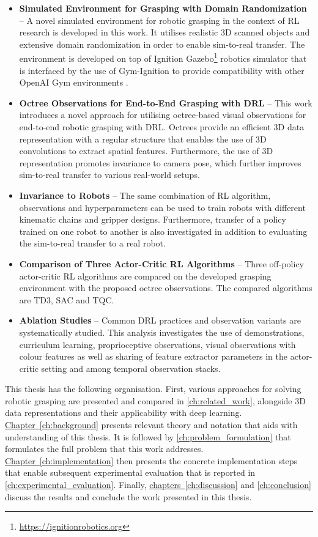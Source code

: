 \begin{itemize}
    \item \textbf{Simulated Environment for Grasping with Domain Randomization} -- A novel simulated environment for robotic grasping in the context of RL research is developed in this work. It utilises realistic 3D scanned objects and extensive domain randomization in order to enable sim-to-real transfer. The environment is developed on top of Ignition Gazebo\footnote{\href{https://ignitionrobotics.org}{https://ignitionrobotics.org}} robotics simulator that is interfaced by the use of Gym-Ignition \cite{ferigo_gym-ignition_2020} to provide compatibility with other OpenAI Gym environments \cite{brockman_openai_2016}.
    \item \textbf{Octree Observations for End-to-End Grasping with DRL} -- This work introduces a novel approach for utilising octree-based visual observations for end-to-end robotic grasping with DRL. Octrees provide an efficient 3D data representation with a regular structure that enables the use of 3D convolutions to extract spatial features. Furthermore, the use of 3D representation promotes invariance to camera pose, which further improves sim-to-real transfer to various real-world setups.
    \item \textbf{Invariance to Robots} -- The same combination of RL algorithm, observations and hyperparameters can be used to train robots with different kinematic chains and gripper designs. Furthermore, transfer of a policy trained on one robot to another is also investigated in addition to evaluating the sim-to-real transfer to a real robot.
    \item \textbf{Comparison of Three Actor-Critic RL Algorithms} -- Three off-policy actor-critic RL algorithms are compared on the developed grasping environment with the proposed octree observations. The compared algorithms are TD3, SAC and TQC.
    \item \textbf{Ablation Studies} -- Common DRL practices and observation variants are systematically studied. This analysis investigates the use of demonstrations, curriculum learning, proprioceptive observations, visual observations with colour features as well as sharing of feature extractor parameters in the actor-critic setting and among temporal observation stacks.
\end{itemize}

This thesis has the following organisation. First, various approaches for solving robotic grasping are presented and compared in \autoref{ch:related_work}, alongside 3D data representations and their applicability with deep learning. \hyperref[ch:background]{Chapter~\ref*{ch:background}} presents relevant theory and notation that aids with understanding of this thesis. It is followed by \autoref{ch:problem_formulation} that formulates the full problem that this work addresses. \hyperref[ch:implementation]{Chapter~\ref*{ch:implementation}} then presents the concrete implementation steps that enable subsequent experimental evaluation that is reported in \autoref{ch:experimental_evaluation}. Finally, \hyperref[ch:discussion]{chapters~\ref*{ch:discussion}} and \ref{ch:conclusion} discuss the results and conclude the work presented in this thesis.
